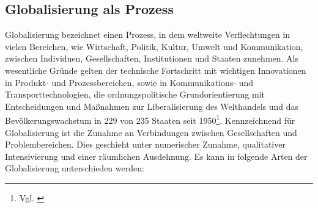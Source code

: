\documentclass[12pt]{article}
\begin{document}
\subsection{Globalisierung als Prozess}\label{subsec:Prozess}
Globalisierung bezeichnet einen Prozess, in dem weltweite Verflechtungen in vielen Bereichen, wie Wirtschaft, Politik, Kultur, Umwelt und Kommunikation, zwischen Individuen, Gesellschaften, Institutionen und Staaten zunehmen. Als wesentliche Gründe gelten der technische Fortschritt mit wichtigen Innovationen in Produkt- und Prozessbereichen, sowie in Kommunikations- und Transporttechnologien, die ordnungspolitische Grundorientierung mit Entscheidungen und Maßnahmen zur Liberalisierung des Welthandels und das Bevölkerungswachstum in 229 von 235 Staaten seit 1950\footnote{Vgl. \cite{UN22}}. Kennzeichnend für Globalisierung ist die Zunahme an Verbindungen zwischen Gesellschaften und Problembereichen. Dies geschieht unter numerischer Zunahme, qualitativer Intensivierung und einer räumlichen Ausdehnung. Es kann in folgende Arten der Globalisierung unterschieden werden:
\end{document}
